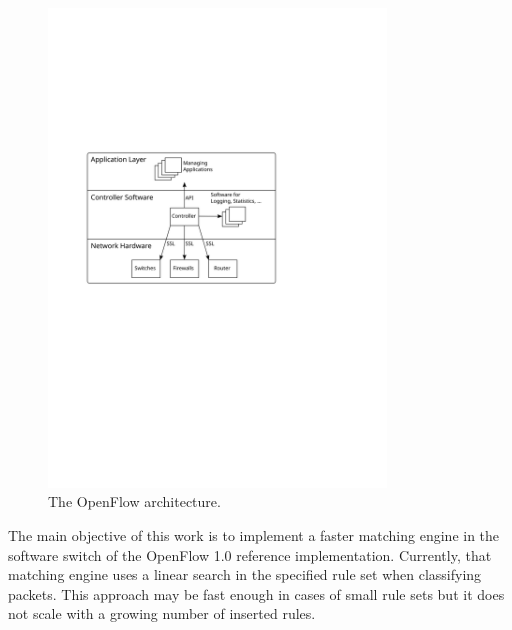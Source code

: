 \documentclass[a4paper,
		12pt,
		parskip=full,
		titlepage
		]{scrartcl}
\begin{document}
\begin{figure}
\centering
\includegraphics[width=0.8\textwidth]{images/openflow-arch}
\caption{The OpenFlow architecture.}
\label{fig:openflow-arch}
\end{figure}

The main objective of this work is to implement a faster matching engine in the software switch of the OpenFlow 1.0 reference implementation.
Currently, that matching engine uses a linear search in the specified rule set when classifying packets.
This approach may be fast enough in cases of small rule sets but it does not scale
with a growing number of inserted rules.
\end{document}

